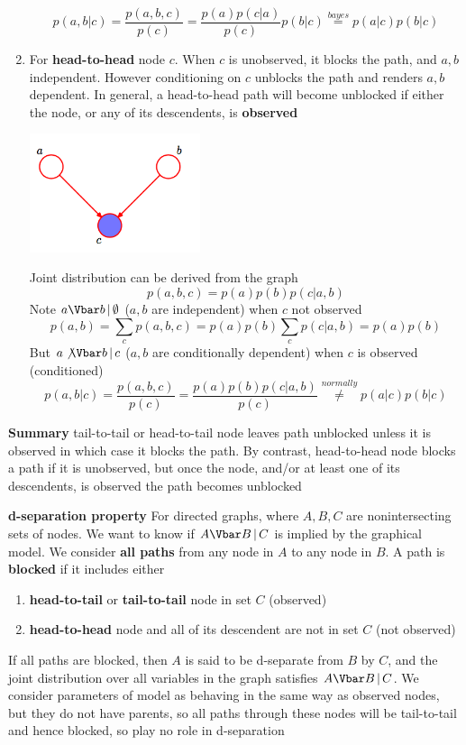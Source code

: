 \documentclass[11pt]{article}
\begin{document}
\begin{defn*}
\begin{enumerate}
        \[
            p(a,b|c) = \frac{p(a,b,c)}{p(c)} = \frac{p(a)p(c|a)}{p(c)} p(b|c) \overset{bayes}{=} p(a|c) p(b|c)
        \]
        \item For \textbf{head-to-head} node $c$. When $c$ is unobserved, it blocks the path, and $a,b$ independent. However conditioning on $c$ unblocks the path and renders $a,b$ dependent. In general, a head-to-head path will become unblocked if either the node, or any of its descendents, is \textbf{observed}
        \begin{center}
            \includegraphics[width=5cm]{example3.png}
        \end{center}
        Joint distribution can be derived from the graph 
        \[
            p(a,b,c) = p(a)p(b)p(c|a,b)
        \]
        Note $\condi{a}{b}{\emptyset}$ ($a,b$ are independent) when $c$ not observed
        \[
            p(a,b) = \sum_c p(a,b,c) = p(a) p(b) \sum_c p(c|a,b) = p(a)p(b)
        \]
        But $\notcondi{a}{b}{c}$ ($a,b$ are conditionally dependent) when $c$ is observed (conditioned)
        \[
            p(a,b|c) = \frac{p(a,b,c)}{p(c)} = \frac{p(a)p(b)p(c|a,b)}{p(c)} \overset{normally}{\neq} p(a|c) p(b|c)
        \]
    \end{enumerate}
    \item \textbf{Summary} tail-to-tail or head-to-tail node leaves path unblocked unless it is observed in which case it blocks the path. By contrast, head-to-head node blocks a path if it is unobserved, but once the node, and/or at least one of its descendents, is observed the path becomes unblocked
\end{defn*}
 


 
\begin{defn*}
    \textbf{d-separation property} For directed graphs, where $A,B,C$ are nonintersecting sets of nodes. We want to know if $\condi{A}{B}{C}$ is implied by the graphical model. We consider \textbf{all paths} from any node in $A$ to any node in $B$. A path is \textbf{blocked} if it includes either 
    \begin{enumerate}
        \item \textbf{head-to-tail} or \textbf{tail-to-tail} node in set $C$ (observed)
        \item \textbf{head-to-head} node and all of its descendent are not in set $C$ (not observed)
    \end{enumerate}
    If all paths are blocked, then $A$ is said to be d-separate from $B$ by $C$, and the joint distribution over all variables in the graph satisfies $\condi{A}{B}{C}$. We consider parameters of model as behaving in the same way as observed nodes, but they do not have parents, so all paths through these nodes will be tail-to-tail and hence blocked, so play no role in d-separation
\end{defn*}
\end{document}
